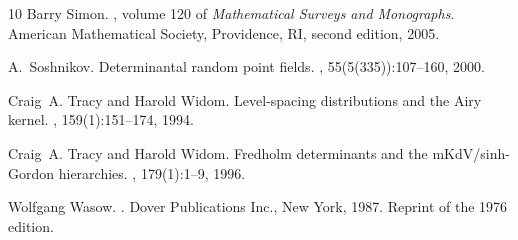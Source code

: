 \documentclass{article}
\begin{document}
\begin{thebibliography}{10}
Barry Simon.
, volume 120 of {\em
  Mathematical Surveys and Monographs}.
\newblock American Mathematical Society, Providence, RI, second edition, 2005.

A.~Soshnikov.
\newblock Determinantal random point fields.
, 55(5(335)):107--160, 2000.

Craig~A. Tracy and Harold Widom.
\newblock Level-spacing distributions and the {A}iry kernel.
, 159(1):151--174, 1994.

Craig~A. Tracy and Harold Widom.
\newblock Fredholm determinants and the m{K}d{V}/sinh-{G}ordon hierarchies.
, 179(1):1--9, 1996.

Wolfgang Wasow.
.
\newblock Dover Publications Inc., New York, 1987.
\newblock Reprint of the 1976 edition.


\end{thebibliography}
\end{document}
